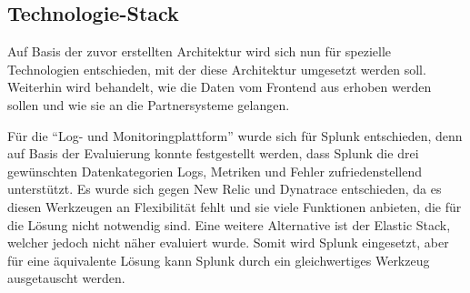 %
%
%	

\pagebreak

	\subsection{Technologie-Stack}
	\label{sec:technologie-stack}
	
	Auf Basis der zuvor erstellten Architektur wird sich nun für spezielle Technologien entschieden, mit der diese Architektur umgesetzt werden soll. Weiterhin wird behandelt, wie die Daten vom Frontend aus erhoben werden sollen und wie sie an die Partnersysteme gelangen.
	
	Für die \enquote{Log- und Monitoringplattform} wurde sich für Splunk entschieden, denn auf Basis der Evaluierung konnte festgestellt werden, dass Splunk die drei gewünschten Datenkategorien Logs, Metriken und Fehler zufriedenstellend unterstützt. Es wurde sich gegen New Relic und Dynatrace entschieden, da es diesen Werkzeugen an Flexibilität fehlt und sie viele Funktionen anbieten, die für die Lösung nicht notwendig sind. Eine weitere Alternative ist der Elastic Stack, welcher jedoch nicht näher evaluiert wurde. Somit wird Splunk eingesetzt, aber für eine äquivalente Lösung kann Splunk durch ein gleichwertiges Werkzeug ausgetauscht werden.
	
